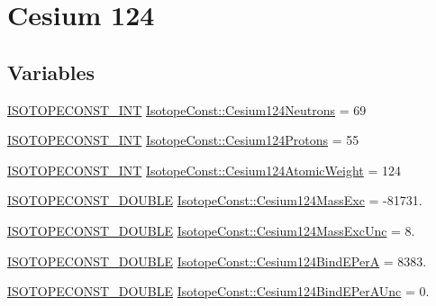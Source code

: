 \hypertarget{group___isotope_const-_cesium-_cs124}{}\section{Cesium 124}
\label{group___isotope_const-_cesium-_cs124}
\subsection*{Variables}
\begin{DoxyCompactItemize}
\item 
\mbox{\hyperlink{group___isotope_const-_macros_ga5f18360b3e99483a35c32d789e62621c}{I\+S\+O\+T\+O\+P\+E\+C\+O\+N\+S\+T\+\_\+\+I\+NT}} \mbox{\hyperlink{group___isotope_const-_cesium-_cs124_ga4bccca35dce24e31f879b4168ffff108}{Isotope\+Const\+::\+Cesium124\+Neutrons}} = 69
\item 
\mbox{\hyperlink{group___isotope_const-_macros_ga5f18360b3e99483a35c32d789e62621c}{I\+S\+O\+T\+O\+P\+E\+C\+O\+N\+S\+T\+\_\+\+I\+NT}} \mbox{\hyperlink{group___isotope_const-_cesium-_cs124_ga92e2fb7dc1d0fa5cac7d67637e5c98b9}{Isotope\+Const\+::\+Cesium124\+Protons}} = 55
\item 
\mbox{\hyperlink{group___isotope_const-_macros_ga5f18360b3e99483a35c32d789e62621c}{I\+S\+O\+T\+O\+P\+E\+C\+O\+N\+S\+T\+\_\+\+I\+NT}} \mbox{\hyperlink{group___isotope_const-_cesium-_cs124_gae345283f1fa5622ed94eeae106612acd}{Isotope\+Const\+::\+Cesium124\+Atomic\+Weight}} = 124
\item 
\mbox{\hyperlink{group___isotope_const-_macros_ga8f45a7272ce02c0b4c65c44636ed719a}{I\+S\+O\+T\+O\+P\+E\+C\+O\+N\+S\+T\+\_\+\+D\+O\+U\+B\+LE}} \mbox{\hyperlink{group___isotope_const-_cesium-_cs124_gaf7f139ce415b6469ac472d0d3a3a384d}{Isotope\+Const\+::\+Cesium124\+Mass\+Exc}} = -\/81731.
\item 
\mbox{\hyperlink{group___isotope_const-_macros_ga8f45a7272ce02c0b4c65c44636ed719a}{I\+S\+O\+T\+O\+P\+E\+C\+O\+N\+S\+T\+\_\+\+D\+O\+U\+B\+LE}} \mbox{\hyperlink{group___isotope_const-_cesium-_cs124_gaa350fc58db21ce9880a992a200198fd1}{Isotope\+Const\+::\+Cesium124\+Mass\+Exc\+Unc}} = 8.
\item 
\mbox{\hyperlink{group___isotope_const-_macros_ga8f45a7272ce02c0b4c65c44636ed719a}{I\+S\+O\+T\+O\+P\+E\+C\+O\+N\+S\+T\+\_\+\+D\+O\+U\+B\+LE}} \mbox{\hyperlink{group___isotope_const-_cesium-_cs124_ga28364a8b2c4059632c379ba897fdd083}{Isotope\+Const\+::\+Cesium124\+Bind\+E\+PerA}} = 8383.
\item 
\mbox{\hyperlink{group___isotope_const-_macros_ga8f45a7272ce02c0b4c65c44636ed719a}{I\+S\+O\+T\+O\+P\+E\+C\+O\+N\+S\+T\+\_\+\+D\+O\+U\+B\+LE}} \mbox{\hyperlink{group___isotope_const-_cesium-_cs124_ga3f79cf95ae14639ec10fa4bc1f876e18}{Isotope\+Const\+::\+Cesium124\+Bind\+E\+Per\+A\+Unc}} = 0.

\end{DoxyCompactItemize}

